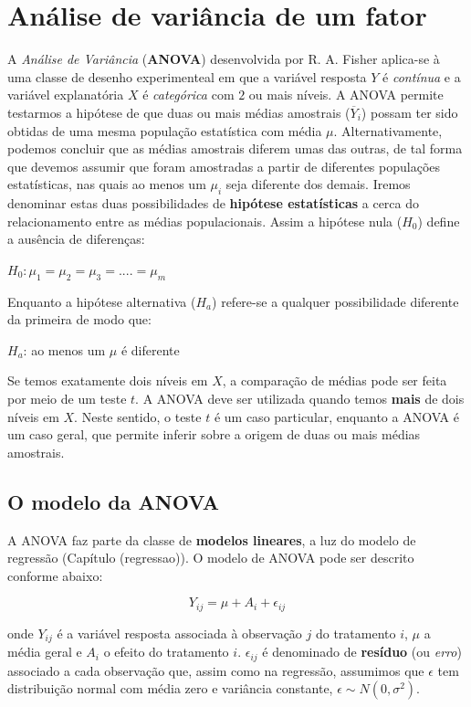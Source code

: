 \documentclass[
]{book}
\begin{document}
\hypertarget{anova}{%
\chapter{Análise de variância de um fator}\label{anova}}

A \emph{Análise de Variância} (\textbf{ANOVA}) desenvolvida por R. A. Fisher aplica-se à uma classe de desenho experimenteal em que a variável resposta \(Y\) é \emph{contínua} e a variável explanatória \(X\) é \emph{categórica} com \(2\) ou mais níveis. A ANOVA permite testarmos a hipótese de que duas ou mais médias amostrais (\(\overline{Y}_i\)) possam ter sido obtidas de uma mesma população estatística com média \(\mu\). Alternativamente, podemos concluir que as médias amostrais diferem umas das outras, de tal forma que devemos assumir que foram amostradas a partir de diferentes populações estatísticas, nas quais ao menos um \(\mu_i\) seja diferente dos demais. Iremos denominar estas duas possibilidades de \textbf{hipótese estatísticas} a cerca do relacionamento entre as médias populacionais. Assim a hipótese nula (\(H_0\)) define a ausência de diferenças:

\(H_0: \mu_1 = \mu_2 = \mu_3 =.... = \mu_m\)

Enquanto a hipótese alternativa (\(H_a\)) refere-se a qualquer possibilidade diferente da primeira de modo que:

\(H_a\): ao menos um \(\mu\) é diferente

Se temos exatamente dois níveis em \(X\), a comparação de médias pode ser feita por meio de um teste \(t\). A ANOVA deve ser utilizada quando temos \textbf{mais} de dois níveis em \(X\). Neste sentido, o teste \(t\) é um caso particular, enquanto a ANOVA é um caso geral, que permite inferir sobre a origem de duas ou mais médias amostrais.

\hypertarget{o-modelo-da-anova}{%
\section{O modelo da ANOVA}\label{o-modelo-da-anova}}

A ANOVA faz parte da classe de \textbf{modelos lineares}, a luz do modelo de regressão (Capítulo (regressao)). O modelo de ANOVA pode ser descrito conforme abaixo:

\[Y_{ij} = \mu + A_i + \epsilon_{ij}\]

onde \(Y_{ij}\) é a variável resposta associada à observação \(j\) do tratamento \(i\), \(\mu\) a média geral e \(A_i\) o efeito do tratamento \(i\). \(\epsilon_{ij}\) é denominado de \textbf{resíduo} (ou \emph{erro}) associado a cada observação que, assim como na regressão, assumimos que \(\epsilon\) tem distribuição normal com média zero e variância constante, \(\epsilon \sim N(0, \sigma^2)\).
\end{document}
